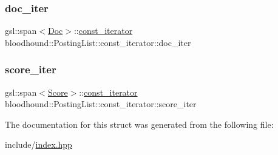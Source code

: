 \subsubsection{\texorpdfstring{doc\+\_\+iter}{doc\_iter}}
{\footnotesize\ttfamily gsl\+::span$<$\mbox{\hyperlink{structbloodhound_1_1Doc}{Doc}}$>$\+::\mbox{\hyperlink{structbloodhound_1_1PostingList_1_1const__iterator}{const\+\_\+iterator}} bloodhound\+::\+Posting\+List\+::const\+\_\+iterator\+::doc\+\_\+iter}

\mbox{\label{structbloodhound_1_1PostingList_1_1const__iterator_ade7c448dfba393cc9e34a901461b6b77}} 
\subsubsection{\texorpdfstring{score\+\_\+iter}{score\_iter}}
{\footnotesize\ttfamily gsl\+::span$<$\mbox{\hyperlink{structbloodhound_1_1Score}{Score}}$>$\+::\mbox{\hyperlink{structbloodhound_1_1PostingList_1_1const__iterator}{const\+\_\+iterator}} bloodhound\+::\+Posting\+List\+::const\+\_\+iterator\+::score\+\_\+iter}



The documentation for this struct was generated from the following file\+:\begin{DoxyCompactItemize}
\item 
include/\mbox{\hyperlink{index_8hpp}{index.\+hpp}}\end{DoxyCompactItemize}
